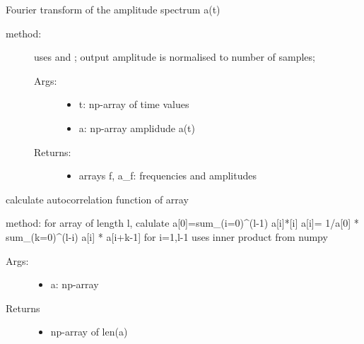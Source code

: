 \documentclass[letterpaper,10pt,english]{sphinxmanual}
\begin{document}
\begin{fulllineitems}
\label{\detokenize{index:PhyPraKit.PhyPraKit.Fourier_fft}}
Fourier transform of the amplitude spectrum a(t)
\begin{description}
\item[{method: }] \leavevmode
uses  and ; 
output amplitude is normalised to number of samples;
\begin{description}
\item[{Args:}] \leavevmode\begin{itemize}
\item {} 
t: np-array of time values

\item {} 
a: np-array amplidude a(t)

\end{itemize}

\item[{Returns:}] \leavevmode\begin{itemize}
\item {} 
arrays f, a\_f: frequencies and amplitudes

\end{itemize}

\end{description}

\end{description}

\end{fulllineitems}


\begin{fulllineitems}
\label{\detokenize{index:PhyPraKit.PhyPraKit.autocorrelate}}
calculate autocorrelation function of array

method: for array of length l, calulate 
a{[}0{]}=sum\_(i=0)\textasciicircum{}(l-1) a{[}i{]}*{[}i{]}
a{[}i{]}= 1/a{[}0{]} * sum\_(k=0)\textasciicircum{}(l-i) a{[}i{]} * a{[}i+k-1{]} for i=1,l-1
uses inner product from numpy
\begin{description}
\item[{Args:}] \leavevmode\begin{itemize}
\item {} 
a: np-array

\end{itemize}

\item[{Returns }] \leavevmode\begin{itemize}
\item {} 
np-array of len(a)

\end{itemize}

\end{description}

\end{fulllineitems}
\end{document}
